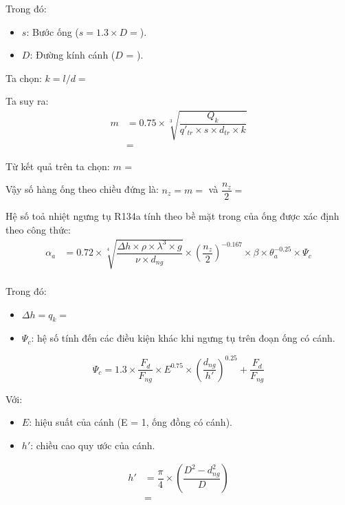Trong đó:
\begin{itemize}
	\item $s$: Bước ống ($s = 1.3\times D =$).
	\item $D$: Đường kính cánh ($D$ = ).
\end{itemize}

Ta chọn: $k = l/d = $

Ta suy ra:
\begin{equation*}
	\begin{split}
		m &= 0.75\times\sqrt[3]{\dfrac{Q_{k}}{q'_{tr}\times s\times d_{tr}\times k}} \\
		&=
	\end{split}
\end{equation*}

Từ kết quả trên ta chọn: $m$ = 

Vậy số hàng ống theo chiều đứng là: $n_{z} = m = $ và $\dfrac{n_{z}}{2} = $

Hệ số toả nhiệt ngưng tụ R134a tính theo bề mặt trong của ống được xác định theo công thức:
\begin{equation*}
	\begin{split}
		\alpha_{a} &= 0.72\times\sqrt[4]{\dfrac{\Delta h\times \rho\times\lambda^3\times g}{\nu\times d_{ng}}}\times\left(\dfrac{n_{z}}{2}\right)^{-0.167}\times\beta\times\theta^{-0.25}_{a}\times\Psi_{c} \\
	\end{split}
\end{equation*}

Trong đó:
\begin{itemize}
	\item $\Delta h = q_{k} = $ 
	\item $\Psi_{c}$: hệ số tính đến các điều kiện khác khi ngưng tụ trên đoạn ống có cánh.
\end{itemize}
\begin{equation*}
	\Psi_{c} = 1.3\times\dfrac{F_{d}}{F_{ng}}\times E^{0.75}\times\left(\dfrac{d_{ng}}{h'}\right)^{0.25} + \dfrac{F_{d}}{F_{ng}}
\end{equation*}

Với:
\begin{itemize}
	\item $E$: hiệu suất của cánh (E = 1, ống đồng có cánh).
	\item $h'$: chiều cao quy ước của cánh.
\end{itemize}
\begin{equation*}
	\begin{split}
		h' &= \dfrac{\pi}{4}\times\left(\dfrac{D^2 - d_{ng}^2}{D}\right)\\
		&=
	\end{split}
\end{equation*}

